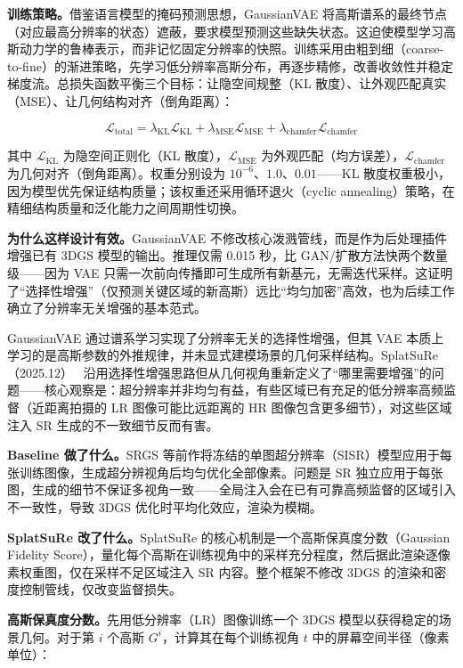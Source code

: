 \textbf{训练策略。}借鉴语言模型的掩码预测思想，GaussianVAE 将高斯谱系的最终节点（对应最高分辨率的状态）遮蔽，要求模型预测这些缺失状态。这迫使模型学习高斯动力学的鲁棒表示，而非记忆固定分辨率的快照。训练采用由粗到细（coarse-to-fine）的渐进策略，先学习低分辨率高斯分布，再逐步精修，改善收敛性并稳定梯度流。总损失函数平衡三个目标：让隐空间规整（KL 散度）、让外观匹配真实（MSE）、让几何结构对齐（倒角距离）：

\begin{equation}
\mathcal{L}_{\text{total}} = \lambda_{\text{KL}} \mathcal{L}_{\text{KL}} + \lambda_{\text{MSE}} \mathcal{L}_{\text{MSE}} + \lambda_{\text{chamfer}} \mathcal{L}_{\text{chamfer}}
\end{equation}

其中 $\mathcal{L}_{\text{KL}}$ 为隐空间正则化（KL 散度），$\mathcal{L}_{\text{MSE}}$ 为外观匹配（均方误差），$\mathcal{L}_{\text{chamfer}}$ 为几何对齐（倒角距离）。权重分别设为 $10^{-6}$、$1.0$、$0.01$——KL 散度权重极小，因为模型优先保证结构质量；该权重还采用循环退火（cyclic annealing）策略，在精细结构质量和泛化能力之间周期性切换。

\textbf{为什么这样设计有效。}GaussianVAE 不修改核心泼溅管线，而是作为后处理插件增强已有 3DGS 模型的输出。推理仅需 0.015 秒，比 GAN/扩散方法快两个数量级——因为 VAE 只需一次前向传播即可生成所有新基元，无需迭代采样。这证明了“选择性增强”（仅预测关键区域的新高斯）远比“均匀加密”高效，也为后续工作确立了分辨率无关增强的基本范式。

GaussianVAE 通过谱系学习实现了分辨率无关的选择性增强，但其 VAE 本质上学习的是高斯参数的外推规律，并未显式建模场景的几何采样结构。SplatSuRe（2025.12）~\cite{2512_02172} 沿用选择性增强思路但从几何视角重新定义了“哪里需要增强”的问题——核心观察是：超分辨率并非均匀有益，有些区域已有充足的低分辨率高频监督（近距离拍摄的 LR 图像可能比远距离的 HR 图像包含更多细节），对这些区域注入 SR 生成的不一致细节反而有害。

\textbf{Baseline 做了什么。}SRGS 等前作将冻结的单图超分辨率（SISR）模型应用于每张训练图像，生成超分辨视角后均匀优化全部像素。问题是 SR 独立应用于每张图，生成的细节不保证多视角一致——全局注入会在已有可靠高频监督的区域引入不一致性，导致 3DGS 优化时平均化效应，渲染为模糊。

\textbf{SplatSuRe 改了什么。}SplatSuRe 的核心机制是一个高斯保真度分数（Gaussian Fidelity Score），量化每个高斯在训练视角中的采样充分程度，然后据此渲染逐像素权重图，仅在采样不足区域注入 SR 内容。整个框架不修改 3DGS 的渲染和密度控制管线，仅改变监督损失。

\textbf{高斯保真度分数。}先用低分辨率（LR）图像训练一个 3DGS 模型以获得稳定的场景几何。对于第 $i$ 个高斯 $G^i$，计算其在每个训练视角 $t$ 中的屏幕空间半径（像素单位）：

